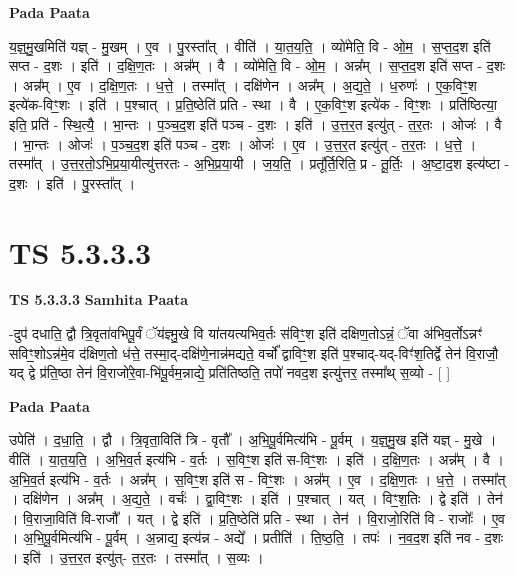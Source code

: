 \documentclass[17pt]{extarticle}
\begin{document}
\textbf{Pada Paata} \newline

य॒ज्ञ्॒मु॒खमिति॑ यज्ञ् - मु॒खम् । ए॒व । पु॒रस्ता᳚त् । वीति॑ । या॒त॒य॒ति॒ । व्यो॑मेति॒ वि - ओ॒म॒ । स॒प्त॒द॒श इति॑ सप्त - द॒शः । इति॑ । द॒क्षि॒ण॒तः । अन्न᳚म् । वै । व्यो॑मेति॒ वि - ओ॒म॒ । अन्न᳚म् । स॒प्त॒द॒श इति॑ सप्त - द॒शः । अन्न᳚म् । ए॒व । द॒क्षि॒ण॒तः । ध॒त्ते॒ । तस्मा᳚त् । दक्षि॑णेन । अन्न᳚म् । अ॒द्य॒ते॒ । ध॒रुणः॑ । ए॒क॒विꣳ॒॒श इत्ये॑क-विꣳ॒॒शः । इति॑ । प॒श्चात् । प्र॒ति॒ष्ठेति॑ प्रति - स्था । वै । ए॒क॒विꣳ॒॒श इत्ये॑क - विꣳ॒॒शः । प्रति॑ष्ठित्या॒ इति॒ प्रति॑ - स्थि॒त्यै॒ । भा॒न्तः । प॒ञ्च॒द॒श इति॑ पञ्च - द॒शः । इति॑ । उ॒त्त॒र॒त इत्यु॑त् - त॒र॒तः । ओजः॑ । वै । भा॒न्तः । ओजः॑ । प॒ञ्च॒द॒श इति॑ पञ्च - द॒शः । ओजः॑ । ए॒व । उ॒त्त॒र॒त इत्यु॑त् - त॒र॒तः । ध॒त्ते॒ । तस्मा᳚त् । उ॒त्त॒र॒तो॒ऽभि॒प्र॒या॒यीत्यु॑त्तरतः - अ॒भि॒प्र॒या॒यी । ज॒य॒ति॒ । प्रतू᳚र्ति॒रिति॒ प्र - तू॒र्तिः॒ । अ॒ष्टा॒द॒श इत्य॑ष्टा - द॒शः । इति॑ । पु॒रस्ता᳚त् ।  \newline





\section{ TS 5.3.3.3 }

\textbf{TS 5.3.3.3 } \newline
\textbf{Samhita Paata} \newline

-दुप॑ दधाति॒ द्वौ त्रि॒वृता॑वभिपू॒र्वं ॅय॑ज्ञ्मु॒खे वि या॑तयत्यभिव॒र्तः स॑विꣳ॒॒श इति॑ दक्षिण॒तोऽन्नं॒ ॅवा अ॑भिव॒र्तोऽन्नꣳ॑ सविꣳ॒॒शोऽन्न॑मे॒व द॑क्षिण॒तो ध॑त्ते॒ तस्मा॒द्-दक्षि॑णे॒नान्न॑मद्यते॒ वर्चो᳚ द्वाविꣳ॒॒श इति॑ प॒श्चाद्-यद्-विꣳ॑श॒तिर्द्वे तेन॑ वि॒राजौ॒ यद् द्वे प्र॑ति॒ष्ठा तेन॑ वि॒राजो॑रे॒वा-भि॑पू॒र्वम॒न्नाद्ये॒ प्रति॑तिष्ठति॒ तपो॑ नवद॒श इत्यु॑त्तर॒ तस्मा᳚थ् स॒व्यो - [  ] \newline

\textbf{Pada Paata} \newline

उपेति॑ । द॒धा॒ति॒ । द्वौ । त्रि॒वृता॒विति॑ त्रि - वृतौ᳚ । अ॒भि॒पू॒र्वमित्य॑भि - पू॒र्वम् । य॒ज्ञ्॒मु॒ख इति॑ यज्ञ् - मु॒खे । वीति॑ । या॒त॒य॒ति॒ । अ॒भि॒व॒र्त इत्य॑भि - व॒र्तः । स॒विꣳ॒॒श इति॑ स-विꣳ॒॒शः । इति॑ । द॒क्षि॒ण॒तः । अन्न᳚म् । वै । अ॒भि॒व॒र्त इत्य॑भि - व॒र्तः । अन्न᳚म् । स॒विꣳ॒॒श इति॑ स - विꣳ॒॒शः । अन्न᳚म् । ए॒व । द॒क्षि॒ण॒तः । ध॒त्ते॒ । तस्मा᳚त् । दक्षि॑णेन । अन्न᳚म् । अ॒द्य॒ते॒ । वर्चः॑ । द्वा॒विꣳ॒॒शः । इति॑ । प॒श्चात् । यत् । विꣳ॒॒श॒तिः । द्वे इति॑ । तेन॑ । वि॒राजा॒विति॑ वि-राजौ᳚ । यत् । द्वे इति॑ । प्र॒ति॒ष्ठेति॑ प्रति - स्था । तेन॑ । वि॒राजो॒रिति॑ वि - राजोः᳚ । ए॒व । अ॒भि॒पू॒र्वमित्य॑भि - पू॒र्वम् । अ॒न्नाद्य॒ इत्य॑न्न - अद्ये᳚ । प्रतीति॑ । ति॒ष्ठ॒ति॒ । तपः॑ । न॒व॒द॒श इति॑ नव - द॒शः । इति॑ । उ॒त्त॒र॒त इत्यु॑त्- त॒र॒तः । तस्मा᳚त् । स॒व्यः ।  \newline
\end{document}

